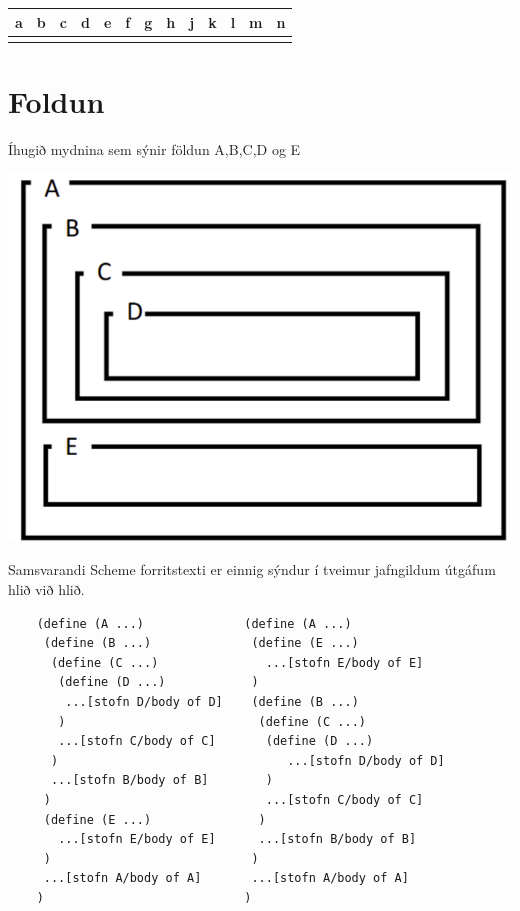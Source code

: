 \documentclass{article}
\newcommand{\bo}[1]{\textbf{#1}}
\begin{document}
\begin{tabularx}{\textwidth}{|X|X|X|X|X|X|X|X|X|X|X|X|X|}
    \hline
    \bo{a} & \bo{b} & \bo{c} & \bo{d} & \bo{e} & \bo{f} & \bo{g} & \bo{h} & \bo{j} & \bo{k} & \bo{l} & \bo{m} & \bo{n} \\ \hline
     & & & & & & & & & & & & \\ \hline
\end{tabularx}

\newpage

\section{Foldun}

Íhugið mydnina sem sýnir földun A,B,C,D og E

\includegraphics[scale = 1 ]{myndir/AbcdFoldun.png}

Samsvarandi Scheme forritstexti er einnig sýndur í tveimur
jafngildum útgáfum hlið við hlið.

\begin{verbatim}
    (define (A ...)              (define (A ...)
     (define (B ...)              (define (E ...)
      (define (C ...)               ...[stofn E/body of E]
       (define (D ...)            )
        ...[stofn D/body of D]    (define (B ...)
       )                           (define (C ...)
       ...[stofn C/body of C]       (define (D ...)
      )                                ...[stofn D/body of D]
      ...[stofn B/body of B]        )
     )                              ...[stofn C/body of C]
     (define (E ...)               ) 
       ...[stofn E/body of E]      ...[stofn B/body of B]
     )                            )
     ...[stofn A/body of A]       ...[stofn A/body of A]
    )                            )
\end{verbatim}
\end{document}
